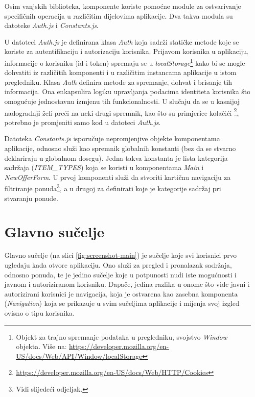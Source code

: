 \documentclass[times, utf8, zavrsni, numeric]{fer}
\begin{document}
Osim vanjskih biblioteka, komponente koriste pomoćne module za ostvarivanje specifičnih operacija u različitim dijelovima aplikacije.
Dva takva modula su datoteke \emph{Auth.js} i \emph{Constants.js}.

U datoteci \emph{Auth.js} je definirana klasa \emph{Auth} koja sadrži statičke metode koje se koriste za autentifikaciju i autorizaciju korisnika.
Prijavom korisnika u aplikaciju, informacije o korisniku (id i token) spremaju se u \emph{localStorage}\footnote{Objekt za trajno spremanje podataka u pregledniku, svojstvo \emph{Window} objekta. Više na: \url{https://developer.mozilla.org/en-US/docs/Web/API/Window/localStorage}} kako bi se mogle dohvatiti iz različitih komponenti i u različitim instancama aplikacije u istom pregledniku.
Klasa \emph{Auth} definira metode za spremanje, dohvat i brisanje tih informacija.
Ona enkapsulira logiku upravljanja podacima identiteta korisnika što omogućuje jednostavnu izmjenu tih funkcionalnosti.
U slučaju da se u kasnijoj nadogradnji želi preći na neki drugi spremnik, kao što su primjerice kolačići \footnote{\url{https://developer.mozilla.org/en-US/docs/Web/HTTP/Cookies}}, potrebno je promjeniti samo kod u datoteci \emph{Auth.js}.

Datoteka \emph{Constants.js} isporučuje nepromjenjive objekte komponentama aplikacije, odnosno služi kao spremnik globalnih konstanti (bez da se stvarno deklariraju u globalnom dosegu).
Jedna takva konstanta je lista kategorija sadržaja (\emph{ITEM\_TYPES}) koja se koristi u komponentama \emph{Main} i \emph{NewOfferForm}.
U prvoj komponenti služi da stvoriti kartičnu navigaciju za filtriranje ponuda\footnote{Vidi slijedeći odjeljak.}, a u drugoj za definirati koje je kategorije sadržaj pri stvaranju ponude.

\newpage


\section{Glavno sučelje}

Glavno sučelje (na slici \ref{fig:screenshot-main}) je sučelje koje svi korisnici prvo ugledaju kada otvore aplikaciju.
Ono služi za pregled i pronalazak sadržaja, odnosno ponuda, te je jedino sučelje koje u potpunosti nudi iste mogućnosti i javnom i autoriziranom korisniku.
Dapače, jedina razlika u onome što vide javni i autorizirani korisnici je navigacija, koja je ostvarena kao zasebna komponenta (\emph{Navigation}) koja se prikazuje u svim sučeljima aplikacije i mijenja svoj izgled ovisno o tipu korisnika.
\end{document}
